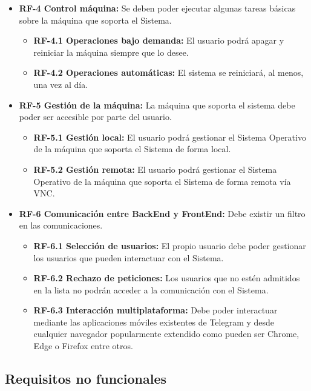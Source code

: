 \begin{itemize}
    \item \textbf{RF-4 Control máquina:} Se deben poder ejecutar algunas tareas básicas sobre la máquina que soporta el Sistema.
    \begin{itemize}
        \item \textbf{RF-4.1 Operaciones bajo demanda:} El usuario podrá apagar y reiniciar la máquina siempre que lo desee.
        \item \textbf{RF-4.2 Operaciones automáticas:} El sistema se reiniciará, al menos, una vez al día.
    \end{itemize}   
    
    \item \textbf{RF-5 Gestión de la máquina:} La máquina que soporta el sistema debe poder ser accesible por parte del usuario.
    \begin{itemize}
        \item \textbf{RF-5.1 Gestión local:} El usuario podrá gestionar el Sistema Operativo de la máquina que soporta el Sistema de forma local.
        \item \textbf{RF-5.2 Gestión remota:} El usuario podrá gestionar el Sistema Operativo de la máquina que soporta el Sistema de forma remota vía VNC.
    \end{itemize}
    
    \item \textbf{RF-6 Comunicación entre BackEnd y FrontEnd:} Debe existir un filtro en las comunicaciones.
    \begin{itemize}
        \item \textbf{RF-6.1 Selección de usuarios:} El propio usuario debe poder gestionar los usuarios que pueden interactuar con el Sistema.
        \item \textbf{RF-6.2 Rechazo de peticiones:} Los usuarios que no estén admitidos en la lista no podrán acceder a la comunicación con el Sistema.
        \item \textbf{RF-6.3 Interacción multiplataforma:} Debe poder interactuar mediante las aplicaciones móviles existentes de Telegram y desde cualquier navegador popularmente extendido como pueden ser Chrome, Edge o Firefox entre otros. 
    \end{itemize}
\end{itemize}

\subsection{\textbf{Requisitos no funcionales}}

